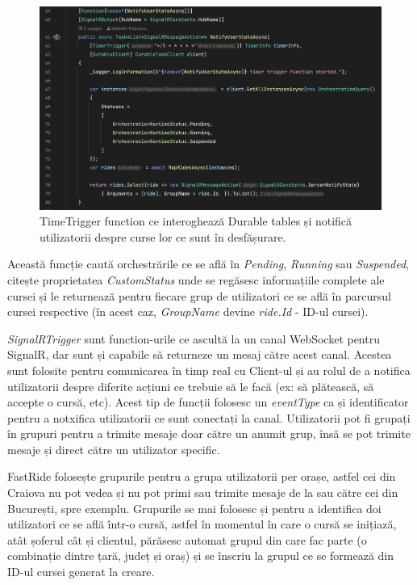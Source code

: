 \begin{figure}[H]
    \centering
    \includegraphics[width=16cm]{Assets/TimeTrigger.png}
    \caption{TimeTrigger function ce interoghează Durable tables și notifică utilizatorii despre curse lor ce sunt în desfășurare.}
    \label{fig:TimeTrigger}
\end{figure}
Această funcție caută orchestrările ce se află în \textit{Pending}, \textit{Running} sau \textit{Suspended},
citește proprietatea \textit{CustomStatus} unde se regăsesc informațiile complete ale cursei și
le returnează pentru fiecare grup de utilizatori ce se află în parcursul cursei respective (în acest caz, \textit{GroupName} devine \textit{ride.Id} - ID-ul cursei).

\textit{SignalRTrigger} sunt function-urile ce ascultă la un canal WebSocket pentru SignalR, dar sunt și capabile să returneze
un mesaj către acest canal. Acestea sunt folosite pentru comunicarea în timp real cu Client-ul și au rolul de a notifica
utilizatorii despre diferite acțiuni ce trebuie să le facă (ex: să plătească, să accepte o cursă, etc).
Acest tip de funcții folosesc un \textit{eventType} ca și identificator pentru a notxifica utilizatorii ce sunt
conectați la canal. Utilizatorii pot fi grupați în grupuri pentru a trimite mesaje doar către un
anumit grup, însă se pot trimite mesaje și direct către un utilizator specific.

FastRide folosește grupurile pentru a grupa utilizatorii per orașe, astfel cei din Craiova nu pot
vedea și nu pot primi sau trimite mesaje de la sau către cei din București, spre exemplu. Grupurile se mai folosesc și
pentru a identifica doi utilizatori ce se află într-o cursă, astfel în momentul în care o cursă se inițiază,
atât șoferul cât și clientul, părăsesc automat grupul din care fac parte (o combinație dintre țară, județ și oraș)
și se înscriu la grupul ce se formează din ID-ul cursei generat la creare.

